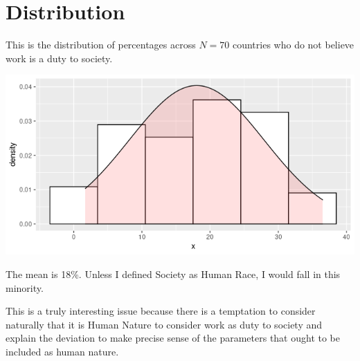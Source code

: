\documentclass{amsart}
\begin{document}
\section{Distribution}

This is the distribution of percentages across $N=70$ countries who do not believe work is a duty to society.

\includegraphics[scale=0.7]{wnduty.png}

The mean is 18\%.  Unless I defined Society as Human Race, I would fall in this minority.

This is a truly interesting issue because there is a temptation to consider naturally that it is Human Nature to consider work as duty to society and explain the deviation to make precise sense of  the parameters that ought to be included as human nature.
\end{document}
